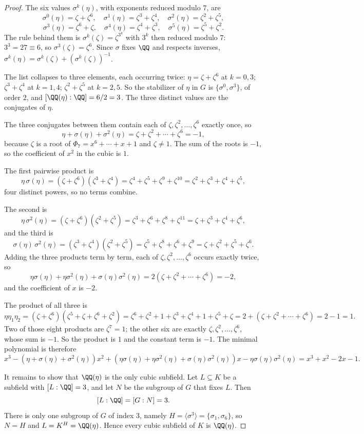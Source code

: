\documentclass[11pt]{article}
\begin{document}
\begin{proof}
The six values $\sigma^{k}(\eta)$, with exponents reduced modulo $7$, are
\[
\sigma^{0}(\eta)=\zeta+\zeta^{6},\quad
\sigma^{1}(\eta)=\zeta^{3}+\zeta^{4},\quad
\sigma^{2}(\eta)=\zeta^{2}+\zeta^{5},
\]
\[
\sigma^{3}(\eta)=\zeta^{6}+\zeta,\quad
\sigma^{4}(\eta)=\zeta^{4}+\zeta^{3},\quad
\sigma^{5}(\eta)=\zeta^{5}+\zeta^{2}.
\]
The rule behind them is $\sigma^{k}(\zeta)=\zeta^{3^{k}}$ with $3^{k}$ then reduced modulo $7$: $3^{3}=27\equiv6$, so $\sigma^{3}(\zeta)=\zeta^{6}$. Since $\sigma$ fixes $\QQ$ and respects inverses, $\sigma^{k}(\eta)=\sigma^{k}(\zeta)+(\sigma^{k}(\zeta))^{-1}$.

The list collapses to three elements, each occurring twice: $\eta=\zeta+\zeta^{6}$ at $k=0,3$; $\zeta^{3}+\zeta^{4}$ at $k=1,4$; $\zeta^{2}+\zeta^{5}$ at $k=2,5$. So the stabilizer of $\eta$ in $G$ is $\{\sigma^{0},\sigma^{3}\}$, of order $2$, and $[\QQ(\eta):\QQ]=6/2=3$. The three distinct values are the conjugates of $\eta$.

The three conjugates between them contain each of $\zeta,\zeta^{2},\dots,\zeta^{6}$ exactly once, so
\[
\eta+\sigma(\eta)+\sigma^{2}(\eta)=\zeta+\zeta^{2}+\cdots+\zeta^{6}=-1,
\]
because $\zeta$ is a root of $\Phi_7=x^{6}+\cdots+x+1$ and $\zeta\ne1$. The sum of the roots is $-1$, so the coefficient of $x^{2}$ in the cubic is $1$.

The first pairwise product is
\[
\eta\,\sigma(\eta)=(\zeta+\zeta^{6})(\zeta^{3}+\zeta^{4})=\zeta^{4}+\zeta^{5}+\zeta^{9}+\zeta^{10}=\zeta^{2}+\zeta^{3}+\zeta^{4}+\zeta^{5},
\]
four distinct powers, so no terms combine.

The second is
\[
\eta\,\sigma^{2}(\eta)=(\zeta+\zeta^{6})(\zeta^{2}+\zeta^{5})=\zeta^{3}+\zeta^{6}+\zeta^{8}+\zeta^{11}=\zeta+\zeta^{3}+\zeta^{4}+\zeta^{6},
\]
and the third is
\[
\sigma(\eta)\,\sigma^{2}(\eta)=(\zeta^{3}+\zeta^{4})(\zeta^{2}+\zeta^{5})=\zeta^{5}+\zeta^{8}+\zeta^{6}+\zeta^{9}=\zeta+\zeta^{2}+\zeta^{5}+\zeta^{6}.
\]
Adding the three products term by term, each of $\zeta,\zeta^{2},\dots,\zeta^{6}$ occurs exactly twice, so
\[
\eta\sigma(\eta)+\eta\sigma^{2}(\eta)+\sigma(\eta)\sigma^{2}(\eta)=2(\zeta+\zeta^{2}+\cdots+\zeta^{6})=-2,
\]
and the coefficient of $x$ is $-2$.

The product of all three is
\[
\eta\eta_1\eta_2=(\zeta+\zeta^{6})(\zeta^{5}+\zeta+\zeta^{6}+\zeta^{2})
=\zeta^{6}+\zeta^{2}+1+\zeta^{3}+\zeta^{4}+1+\zeta^{5}+\zeta
=2+(\zeta+\zeta^{2}+\cdots+\zeta^{6})=2-1=1.
\]
Two of those eight products are $\zeta^{7}=1$; the other six are exactly $\zeta,\zeta^{2},\dots,\zeta^{6}$, whose sum is $-1$. So the product is $1$ and the constant term is $-1$. The minimal polynomial is therefore
\[
x^{3}-(\eta+\sigma(\eta)+\sigma^{2}(\eta))x^{2}+(\eta\sigma(\eta)+\eta\sigma^{2}(\eta)+\sigma(\eta)\sigma^{2}(\eta))x-\eta\sigma(\eta)\sigma^{2}(\eta)
=x^{3}+x^{2}-2x-1.
\]

It remains to show that $\QQ(\eta)$ is the only cubic subfield. Let $L\subseteq K$ be a subfield with $[L:\QQ]=3$, and let $N$ be the subgroup of $G$ that fixes $L$. Then
\[
[L:\QQ]=[G:N]=3.
\]
There is only one subgroup of $G$ of index $3$, namely $H=\langle\sigma^{3}\rangle=\{\sigma_1,\sigma_6\}$, so $N=H$ and $L=K^{H}=\QQ(\eta)$. Hence every cubic subfield of $K$ is $\QQ(\eta)$.
\end{proof}
\end{document}
